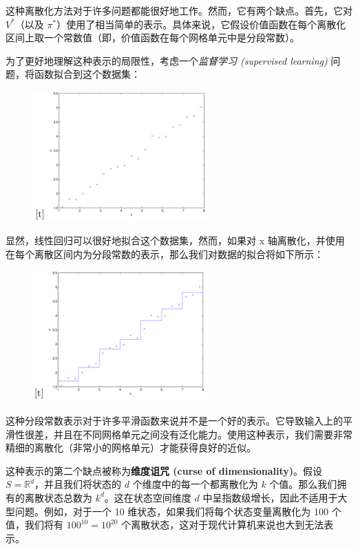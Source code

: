这种离散化方法对于许多问题都能很好地工作。然而，它有两个缺点。首先，它对 $V^*$（以及 $\pi^*$）使用了相当简单的表示。具体来说，它假设价值函数在每个离散化区间上取一个常数值（即，价值函数在每个网格单元中是分段常数）。

为了更好地理解这种表示的局限性，考虑一个\textit{监督学习 (supervised learning)} 问题，将函数拟合到这个数据集：

\begin{figure}[H]
    \centering
    \includegraphics[width=0.6\textwidth]{figs/rl_dataset.png}
\end{figure}

显然，线性回归可以很好地拟合这个数据集，然而，如果对 x 轴离散化，并使用在每个离散区间内为分段常数的表示，那么我们对数据的拟合将如下所示：

\begin{figure}[H]
    \centering
    \includegraphics[width=0.6\textwidth]{figs/rl_dataset_discrete.png}
\end{figure}

这种分段常数表示对于许多平滑函数来说并不是一个好的表示。它导致输入上的平滑性很差，并且在不同网格单元之间没有泛化能力。使用这种表示，我们需要非常精细的离散化（非常小的网格单元）才能获得良好的近似。

这种表示的第二个缺点被称为\textbf{维度诅咒 (curse of dimensionality)}。假设 $S = \mathbb{R}^d$，并且我们将状态的 $d$ 个维度中的每一个都离散化为 $k$ 个值。那么我们拥有的离散状态总数为 $k^d$。这在状态空间维度 $d$ 中呈指数级增长，因此不适用于大型问题。例如，对于一个 10 维状态，如果我们将每个状态变量离散化为 100 个值，我们将有 $100^{10} = 10^{20}$ 个离散状态，这对于现代计算机来说也大到无法表示。

